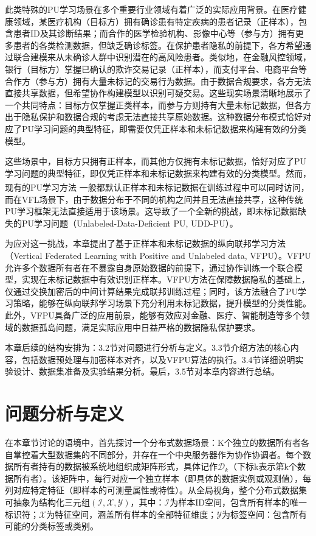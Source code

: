 此类特殊的PU学习场景在多个重要行业领域有着广泛的实际应用背景。在医疗健康领域，某医疗机构（目标方）拥有确诊患有特定疾病的患者记录（正样本），包含患者ID及其诊断结果；而合作的医学检验机构、影像中心等（参与方）拥有更多患者的各类检测数据，但缺乏确诊标签。在保护患者隐私的前提下，各方希望通过联合建模来从未确诊人群中识别潜在的高风险患者。类似地，在金融风控领域，银行（目标方）掌握已确认的欺诈交易记录（正样本），而支付平台、电商平台等合作方（参与方）拥有大量未标记的交易行为数据。由于数据合规要求，各方无法直接共享数据，但希望协作构建模型以识别可疑交易。这些现实场景清晰地展示了一个共同特点：目标方仅掌握正类样本，而参与方则持有大量未标记数据，但各方出于隐私保护和数据合规的考虑无法直接共享原始数据。这种数据分布模式恰好对应了PU学习问题的典型特征，即需要仅凭正样本和未标记数据来构建有效的分类模型。

这些场景中，目标方只拥有正样本，而其他方仅拥有未标记数据，恰好对应了PU学习问题的典型特征，即仅凭正样本和未标记数据来构建有效的分类模型。然而，现有的PU学习方法\textsuperscript{\cite{mordelet2014bagging, liu2003building, liu2015classification, xu2017multi}} 一般都默认正样本和未标记数据在训练过程中可以同时访问，而在VFL场景下，由于数据分布于不同的机构之间并且无法直接共享，这种传统PU学习框架无法直接适用于该场景。这导致了一个全新的挑战，即未标记数据缺失的PU学习问题（Unlabeled-Data-Deficient PU, UDD-PU）。

为应对这一挑战，本章提出了基于正样本和未标记数据的纵向联邦学习方法（Vertical Federated Learning with Positive and Unlabeled data, VFPU）。VFPU允许多个数据所有者在不暴露自身原始数据的前提下，通过协作训练一个联合模型，实现在未标记数据中有效识别正样本。VFPU方法在保障数据隐私的基础上，仅通过交换加密后的中间计算结果完成联邦训练过程；同时，该方法融合了PU学习策略，能够在纵向联邦学习场景下充分利用未标记数据，提升模型的分类性能。此外，VFPU具备广泛的应用前景，能够有效应对金融、医疗、智能制造等多个领域的数据孤岛问题，满足实际应用中日益严格的数据隐私保护要求。

本章后续的结构安排为：3.2节对问题进行分析与定义。3.3节介绍方法的核心内容，包括数据预处理与加密样本对齐，以及VFPU算法的执行。3.4节详细说明实验设计、数据集准备及实验结果分析。最后，3.5节对本章内容进行总结。


\section{问题分析与定义}
在本章节讨论的语境中，首先探讨一个分布式数据场景：K个独立的数据所有者各自掌控着大型数据集的不同部分，并存在一个中央服务器作为协作协调者。每个数据所有者持有的数据被系统地组织成矩阵形式，具体记作${{\mathsf{\mathcal{D}}}_{k}}$（下标k表示第k个数据所有者）。该矩阵中，每行对应一个独立样本（即具体的数据实例或观测值），每列对应特定特征（即样本的可测量属性或特性）。从全局视角，整个分布式数据集可抽象为结构化三元组$(\mathsf{\mathcal{I}}, \mathsf{\mathcal{X}}, \mathsf{\mathcal{Y}})$，其中：$\mathsf{\mathcal{I}}$为样本ID空间，包含所有样本的唯一标识符；$\mathsf{\mathcal{X}}$为特征空间，涵盖所有样本的全部特征维度；$\mathsf{\mathcal{Y}}$为标签空间：包含所有可能的分类标签或类别。

